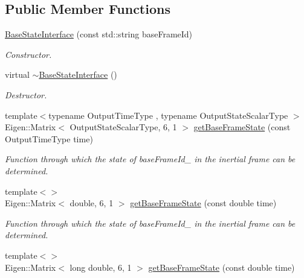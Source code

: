 \subsection*{Public Member Functions}
\begin{DoxyCompactItemize}
\item 
\hyperlink{classtudat_1_1simulation__setup_1_1BaseStateInterface_aaef83a88c7daddd073c395d2c7f12361}{Base\+State\+Interface} (const std\+::string base\+Frame\+Id)
\begin{DoxyCompactList}\small\item\em Constructor. \end{DoxyCompactList}\item 
virtual \hyperlink{classtudat_1_1simulation__setup_1_1BaseStateInterface_ab3c1b1a5b34c7518b6ca72830835ee30}{$\sim$\+Base\+State\+Interface} ()\hypertarget{classtudat_1_1simulation__setup_1_1BaseStateInterface_ab3c1b1a5b34c7518b6ca72830835ee30}{}\label{classtudat_1_1simulation__setup_1_1BaseStateInterface_ab3c1b1a5b34c7518b6ca72830835ee30}

\begin{DoxyCompactList}\small\item\em Destructor. \end{DoxyCompactList}\item 
{\footnotesize template$<$typename Output\+Time\+Type , typename Output\+State\+Scalar\+Type $>$ }\\Eigen\+::\+Matrix$<$ Output\+State\+Scalar\+Type, 6, 1 $>$ \hyperlink{classtudat_1_1simulation__setup_1_1BaseStateInterface_a85b381f111bb8d6b3127acb85ecde227}{get\+Base\+Frame\+State} (const Output\+Time\+Type time)
\begin{DoxyCompactList}\small\item\em Function through which the state of base\+Frame\+Id\+\_\+ in the inertial frame can be determined. \end{DoxyCompactList}\item 
{\footnotesize template$<$$>$ }\\Eigen\+::\+Matrix$<$ double, 6, 1 $>$ \hyperlink{classtudat_1_1simulation__setup_1_1BaseStateInterface_a7c53f5a0e9ed86b220c6755a26a31214}{get\+Base\+Frame\+State} (const double time)\hypertarget{classtudat_1_1simulation__setup_1_1BaseStateInterface_a7c53f5a0e9ed86b220c6755a26a31214}{}\label{classtudat_1_1simulation__setup_1_1BaseStateInterface_a7c53f5a0e9ed86b220c6755a26a31214}

\begin{DoxyCompactList}\small\item\em Function through which the state of base\+Frame\+Id\+\_\+ in the inertial frame can be determined. \end{DoxyCompactList}\item 
{\footnotesize template$<$$>$ }\\Eigen\+::\+Matrix$<$ long double, 6, 1 $>$ \hyperlink{classtudat_1_1simulation__setup_1_1BaseStateInterface_a9ef1139380260ef592c40897d51f20fb}{get\+Base\+Frame\+State} (const double time)\hypertarget{classtudat_1_1simulation__setup_1_1BaseStateInterface_a9ef1139380260ef592c40897d51f20fb}{}\label{classtudat_1_1simulation__setup_1_1BaseStateInterface_a9ef1139380260ef592c40897d51f20fb}


\end{DoxyCompactItemize}
